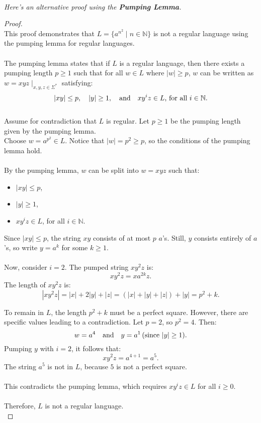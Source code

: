 \documentclass[12pt]{article}
\begin{document}
\leavevmode\\
\textit{Here's an alternative proof using the \textbf{Pumping Lemma}.}
\begin{proof}
\leavevmode\\
    This proof demonstrates that \( L = \{ a^{n^2} \mid n \in \mathbb{N} \} \) is not a regular language using the pumping lemma for regular languages. \\
    \\
    The pumping lemma states that if \( L \) is a regular language, then there exists a pumping length \( p \geq 1 \) such that for all \( w \in L \) where \( |w| \geq p \), \( w \) can be written as \( w = xyz \mid_{x, y, z \in \Sigma^*} \) satisfying:
    \[
    |xy| \leq p, \quad |y| \geq 1, \quad \text{and} \quad xy^iz \in L \text{, for all \( i \in \mathbb{N} \).}
    \]
    \\
    Assume for contradiction that \( L \) is regular. Let \( p \geq 1 \) be the pumping length given by the pumping lemma. \\
    Choose \( w = a^{p^2} \in L \). Notice that \( |w| = p^2 \geq p \), so the conditions of the pumping lemma hold. \\
    \\
    By the pumping lemma, \( w \) can be split into \( w = xyz \) such that:
    \begin{itemize}
        \item \( |xy| \leq p \),
        \item \( |y| \geq 1 \),
        \item \( xy^iz \in L \), for all \( i \in \mathbb{N} \).
    \end{itemize}
    Since \( |xy| \leq p \), the string \( xy \) consists of at most \( p \) \( a \)'s. Still, \( y \) consists entirely of \( a \)'s, so write \( y = a^k \) for some \( k \geq 1 \). \\
    \\
    Now, consider \( i = 2 \). The pumped string \( xy^2z \) is:
    \[
    xy^2z = x a^{2k} z.
    \]
    The length of \( xy^2z \) is:
    \[
    |xy^2z| = |x| + 2|y| + |z| = (|x| + |y| + |z|) + |y| = p^2 + k.
    \]

    \noindent To remain in \( L \), the length \( p^2 + k \) must be a perfect square. However, there are specific values leading to a contradiction. Let \( p = 2 \), so \( p^2 = 4 \). Then:
    \[
    w = a^4 \quad \text{and} \quad y = a^1 \, (\text{since \( |y| \geq 1 \)}).
    \]
    Pumping \( y \) with \( i = 2 \), it follows that:
    \[
    xy^2z = a^{4 + 1} = a^5.
    \]
    The string \( a^5 \) is not in \( L \), because \( 5 \) is not a perfect square. \\
    \\
    This contradicts the pumping lemma, which requires \( xy^iz \in L \) for all \( i \geq 0 \). \\
    \\
    Therefore, \( L \) is not a regular language. \\
\end{proof}
\pagebreak
\end{document}
